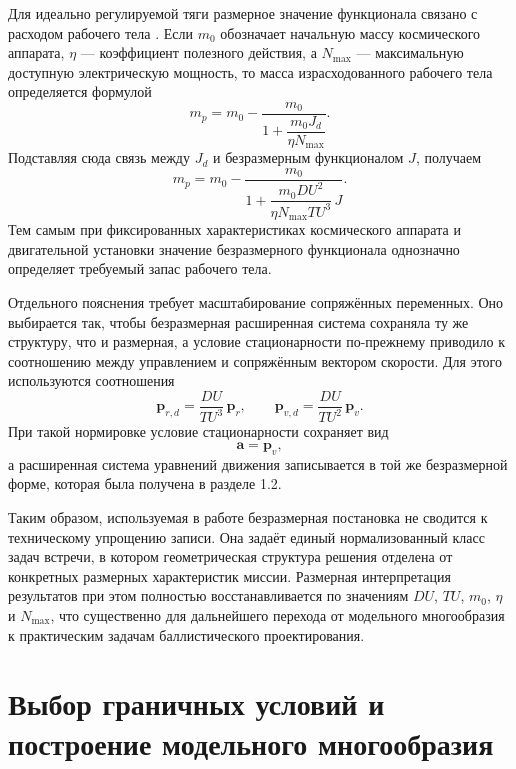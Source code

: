 Для идеально регулируемой тяги размерное значение функционала связано с расходом рабочего тела \cite{grodzovsky_small_thrust_1966}. Если $m_0$ обозначает начальную массу космического аппарата, $\eta$ --- коэффициент полезного действия, а $N_{\max}$ --- максимальную доступную электрическую мощность, то масса израсходованного рабочего тела определяется формулой
\begin{equation}
	m_p=
	m_0-\frac{m_0}{1+\dfrac{m_0J_d}{\eta N_{\max}}}.
\end{equation}
Подставляя сюда связь между $J_d$ и безразмерным функционалом $J$, получаем
\begin{equation}
	m_p=
	m_0-\frac{m_0}{1+\dfrac{m_0DU^2}{\eta N_{\max}TU^3}\,J}.
\end{equation}
Тем самым при фиксированных характеристиках космического аппарата и двигательной установки значение безразмерного функционала однозначно определяет требуемый запас рабочего тела.

Отдельного пояснения требует масштабирование сопряжённых переменных. Оно выбирается так, чтобы безразмерная расширенная система сохраняла ту же структуру, что и размерная, а условие стационарности по-прежнему приводило к соотношению между управлением и сопряжённым вектором скорости. Для этого используются соотношения
\begin{equation}
	\mathbf p_{r,d} = \frac{DU}{TU^3}\,\mathbf p_r,\qquad
	\mathbf p_{v,d} = \frac{DU}{TU^2}\,\mathbf p_v.
\end{equation}
При такой нормировке условие стационарности сохраняет вид
\begin{equation}
	\mathbf a=\mathbf p_v,
\end{equation}
а расширенная система уравнений движения записывается в той же безразмерной форме, которая была получена в разделе 1.2.

Таким образом, используемая в работе безразмерная постановка не сводится к техническому упрощению записи. Она задаёт единый нормализованный класс задач встречи, в котором геометрическая структура решения отделена от конкретных размерных характеристик миссии. Размерная интерпретация результатов при этом полностью восстанавливается по значениям $DU$, $TU$, $m_0$, $\eta$ и $N_{\max}$, что существенно для дальнейшего перехода от модельного многообразия к практическим задачам баллистического проектирования.

\section{Выбор граничных условий и построение модельного многообразия}

